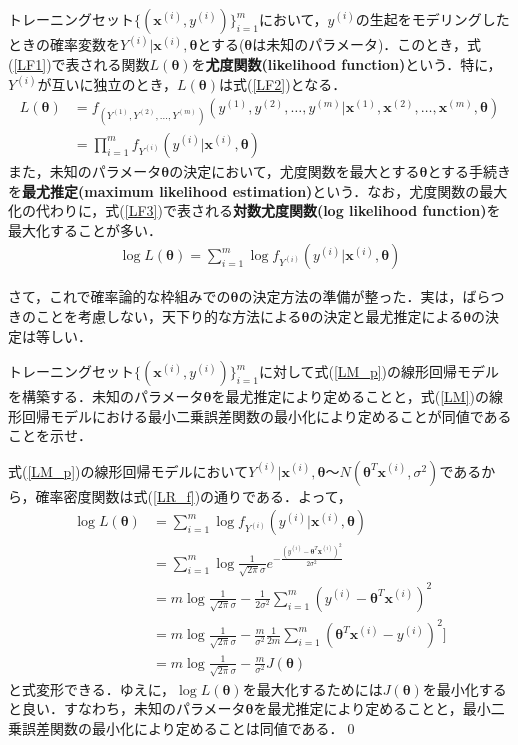 \begin{defi}
トレーニングセット$\{({\bm x}^{(i)},y^{(i)})\}_{i=1}^m$において，$y^{(i)}$の生起をモデリングしたときの確率変数を$Y^{(i)}|{\bm x}^{(i)},{\bm \theta}$とする(${\bm \theta}$は未知のパラメータ)．このとき，式(\ref{LF1})で表される関数$L({\bm \theta})$を{\bf 尤度関数(likelihood function)}という．特に，$Y^{(i)}$が互いに独立のとき，$L({\bm \theta})$は式(\ref{LF2})となる．
\begin{align}
L({\bm \theta})&=f_{(Y^{(1)},Y^{(2)},\ldots,Y^{(m)})}(y^{(1)},y^{(2)},\ldots,y^{(m)}|{\bm x}^{(1)},{\bm x}^{(2)},\ldots,{\bm x}^{(m)},{\bm \theta})\label{LF1}\\
&=\prod_{i=1}^m f_{Y^{(i)}}(y^{(i)}|{\bm x}^{(i)},{\bm \theta})\label{LF2}
\end{align}
また，未知のパラメータ${\bm \theta}$の決定において，尤度関数を最大とする${\bm \theta}$とする手続きを{\bf 最尤推定(maximum likelihood estimation)}という．なお，尤度関数の最大化の代わりに，式(\ref{LF3})で表される{\bf 対数尤度関数(log likelihood function)}を最大化することが多い．
\begin{align}
\log L({\bm \theta})=\sum_{i=1}^m \log f_{Y^{(i)}}(y^{(i)}|{\bm x}^{(i)},{\bm \theta})\label{LF3}
\end{align}
\end{defi}

さて，これで確率論的な枠組みでの${\bm \theta}$の決定方法の準備が整った．実は，ばらつきのことを考慮しない，天下り的な方法による${\bm \theta}$の決定と最尤推定による${\bm \theta}$の決定は等しい．


\begin{qu}
トレーニングセット$\{({\bm x}^{(i)},y^{(i)})\}_{i=1}^m$に対して式(\ref{LM_p})の線形回帰モデルを構築する．未知のパラメータ${\bm \theta}$を最尤推定により定めることと，式(\ref{LM})の線形回帰モデルにおける最小二乗誤差関数の最小化により定めることが同値であることを示せ．
\end{qu}
\begin{ans}
式(\ref{LM_p})の線形回帰モデルにおいて$Y^{(i)}|{\bm x}^{(i)},{\bm \theta}〜N({\bm \theta}^T {\bm x}^{(i)},\sigma^2)$であるから，確率密度関数は式(\ref{LR_f})の通りである．よって，
\begin{align*}
\log L({\bm \theta})&=\sum_{i=1}^m \log f_{Y^{(i)}}(y^{(i)}|{\bm x}^{(i)},{\bm \theta})\\
&=\sum_{i=1}^m \log \frac{1}{\sqrt{2\pi }\sigma}e^{-\frac{(y^{(i)}-{\bm \theta}^T {\bm x}^{(i)})^2}{2\sigma^2}}\\
&= m \log \frac{1}{\sqrt{2\pi }\sigma}-\frac{1}{2\sigma^2}\sum_{i=1}^m(y^{(i)}-{\bm \theta}^T {\bm x}^{(i)})^2\\
&= m \log \frac{1}{\sqrt{2\pi }\sigma}-\frac{m}{\sigma^2}\frac{1}{2m}\sum_{i=1}^m({\bm \theta}^T {\bm x}^{(i)}-y^{(i)})^2]\\
&=m \log \frac{1}{\sqrt{2\pi }\sigma}-\frac{m}{\sigma^2}J({\bm \theta})
\end{align*}
と式変形できる．ゆえに，$\log L({\bm \theta})$を最大化するためには$J({\bm \theta})$を最小化すると良い．すなわち，未知のパラメータ${\bm \theta}$を最尤推定により定めることと，最小二乗誤差関数の最小化により定めることは同値である．\qed
\end{ans}

